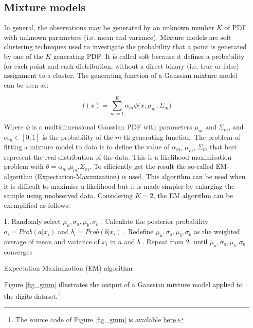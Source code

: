 \subsection{Mixture models} \label{secGaussianMixture}
In general, the observations may be generated by an unknown number $K$ of PDF with unknown parameters (i.e. mean and variance). Mixture models are soft clustering techniques used to investigate the probability that a point is generated by one of the $K$ generating PDF. It is called soft because it defines a probability for each point and each distribution, without a direct binary (i.e. true or false) assignment to a cluster. The generating function of a Gaussian mixture model can be seen as:

\begin{equation}
f\left(x\right)=\sum_{m=1}^{K}{\alpha_m\phi(x;\mu_m;\Sigma_m})
\label{eq_gmm}
\end{equation}

Where $\phi$ is a multidimensional Gaussian PDF with parameters $\mu_m$ and $\Sigma_m$, and $\alpha_m\in[0,1]$ is the probability of the $m$-th generating function. The problem of fitting a mixture model to data is to define the value of $\alpha_m$, $\mu_m$, $\Sigma_m$ that best represent the real distribution of the data. This is a likelihood maximisation problem with $\theta=\alpha_m$,$\mu_m$,$\Sigma_m$. To efficiently get the result the so-called EM-algorithm (Expectation-Maximization) is used. This algorithm can be used when it is difficult to maximise a likelihood but it is made simpler by enlarging the sample using unobserved data. Considering $K=2$, the EM algorithm can be exemplified as follows:

\begin{algorithm}[H]
\DontPrintSemicolon
\SetAlgoLined
    
    1. Randomly select $\mu_a,\sigma_a,\mu_b,\sigma_b$ . Calculate the posterior probability $a_i=Prob(a|x_i)$ and $b_i=Prob(b|x_i)$ . Redefine $\mu_a,\sigma_a,\mu_b,\sigma_b$ as the weighted average of mean and variance of $x_i$ in $a$ and $b$ . Repeat from 2. until $\mu_a,\sigma_a,\mu_b,\sigma_b$ converges\;
    
    
    
   
\caption{Expectation Maximization (EM) algorithm}
\label{algo_EM}        
\end{algorithm}

Figure \ref{fig_gmm} illustrates the output of a Gaussian mixture model applied to the digits dataset.\footnote{The source code of Figure \ref{fig_gmm} is available \href{https://github.com/aletuf93/logproj/blob/master/examples/06.\%20Unsupervised\%20learning.ipynb}{here}.}

